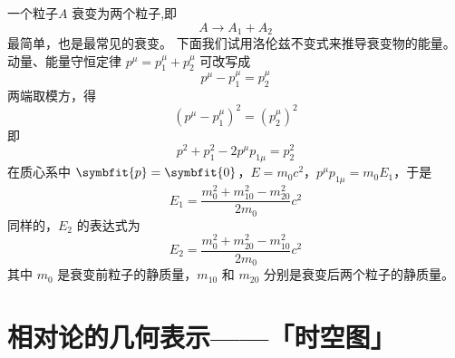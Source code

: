 一个粒子$A$ 衰变为两个粒子,即
\begin{equation}
    A \to A_1 + A_2
\end{equation}
最简单，也是最常见的衰变。
下面我们试用洛伦兹不变式来推导衰变物的能量。
动量、能量守恒定律 $p^\mu = p_1^\mu + p_2^\mu$ 可改写成
\begin{equation}
    p^\mu - p_1^\mu = p_2^\mu
\end{equation}
两端取模方，得
\begin{equation}
    (p^\mu - p_1^\mu)^2 = (p_2^\mu)^2
\end{equation}
即
\begin{equation}
    p^2 + p_1^2 - 2 p^\mu p_{1\mu} = p_2^2
\end{equation}
在质心系中 $\symbfit{p} = \symbfit{0}$，$E = m_0 c^2$，$p^\mu p_{1\mu} = m_0 E_1$，于是
\begin{equation}
    E_1 = \frac{m_0^2 + m_{10}^2 - m_{20}^2}{2 m_0} c^2
\end{equation}
同样的，$E_2$ 的表达式为
\begin{equation}
    E_2 = \frac{m_0^2 + m_{20}^2 - m_{10}^2}{2 m_0} c^2
\end{equation}
其中 $m_0$ 是衰变前粒子的静质量，$m_{10}$ 和 $m_{20}$ 分别是衰变后两个粒子的静质量。

\section{相对论的几何表示——「时空图」}

\



